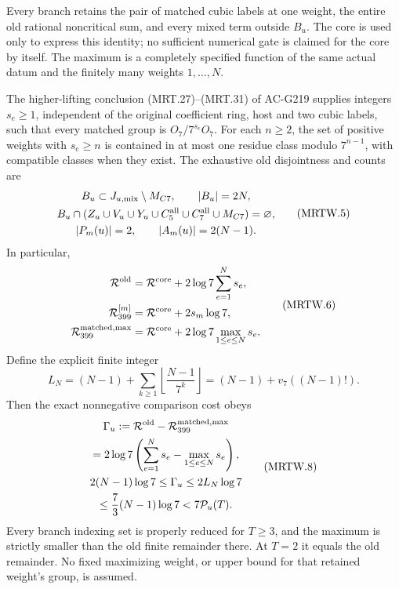 Every branch retains the pair of matched cubic labels at one
weight, the entire old rational noncritical sum, and every mixed
term outside $B_u$. The core is used only to express this identity;
no sufficient numerical gate is claimed for the core by itself.
The maximum is a completely specified function of the same actual
datum and the finitely many weights $1,\ldots,N$.

\begin{theorem}
\label{AC-G220-window}
The higher-lifting conclusion (MRT.27)--(MRT.31) of AC-G219
supplies integers $s_e\geq1$, independent of the original coefficient
ring, host and two cubic labels, such that every matched group is
$O_7/7^{s_e}O_7$. For each $n\geq2$, the set of positive weights
with $s_e\geq n$ is contained in at most one residue class modulo
$7^{n-1}$, with compatible classes when they exist.
The exhaustive old disjointness and counts are
\[
 \begin{gathered}
 B_u\subset J_{u,\rm mix}\setminus M_{C7},\qquad |B_u|=2N,\\
 B_u\cap(Z_u\cup V_u\cup Y_u\cup C_5^{\rm all}
                    \cup C_7^{\rm all}\cup M_{C7})=\varnothing,\\
 |P_m(u)|=2,\qquad |A_m(u)|=2(N-1).
 \end{gathered}\tag{MRTW.5}
\]
In particular,
\[
 \begin{aligned}
 \mathcal R^{\rm old}&=\mathcal R^{\rm core}
                             +2\log7\sum_{e=1}^{N}s_e,\\
 \mathcal R_{399}^{[m]}&=\mathcal R^{\rm core}+2s_m\log7,\\
 \mathcal R_{399}^{\rm matched,max}
       &=\mathcal R^{\rm core}+2\log7\max_{1\leq e\leq N}s_e.
 \end{aligned}\tag{MRTW.6}
\]
Define the explicit finite integer
\[
 L_N=(N-1)+\sum_{k\geq1}\left\lfloor\frac{N-1}{7^k}\right\rfloor
       =(N-1)+v_7((N-1)!).
 \tag{MRTW.7}
\]
Then the exact nonnegative comparison cost obeys
\[
 \begin{gathered}
 \Gamma_u:=\mathcal R^{\rm old}
                       -\mathcal R_{399}^{\rm matched,max}\\
       =2\log7\left(\sum_{e=1}^{N}s_e-\max_{1\leq e\leq N}s_e\right),\\
 2(N-1)\log7\leq\Gamma_u\leq2L_N\log7\\
       \leq\frac73(N-1)\log7<7\mathcal P_u(T).
 \end{gathered}\tag{MRTW.8}
\]
Every branch indexing set is properly reduced for $T\geq3$,
and the maximum is strictly smaller than the old finite remainder
there. At $T=2$ it equals the old remainder.
No fixed maximizing weight, or upper bound for that retained
weight's group, is assumed.


\end{theorem}
